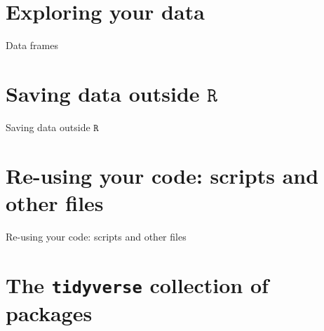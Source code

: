 \documentclass[
  11pt,
  ignorenonframetext,
]{beamer}
\newcommand{\R}{\texttt{R}}
\begin{document}
\begin{frame}{}
\protect\hypertarget{section}{}
\end{frame}

\hypertarget{exploring-your-data}{%
\section{Exploring your data}\label{exploring-your-data}}

\begin{frame}{Data frames}
\protect\hypertarget{data-frames}{}
\end{frame}

\hypertarget{saving-data-outside-r}{%
\section{\texorpdfstring{Saving data outside
\(\R\)}{Saving data outside \textbackslash R}}\label{saving-data-outside-r}}

\begin{frame}{Saving data outside \(\R\)}
\end{frame}

\hypertarget{re-using-your-code-scripts-and-other-files}{%
\section{Re-using your code: scripts and other
files}\label{re-using-your-code-scripts-and-other-files}}

\begin{frame}{Re-using your code: scripts and other files}
\end{frame}

\hypertarget{the-tidyverse-collection-of-packages}{%
\section{\texorpdfstring{The \texttt{tidyverse} collection of
packages}{The tidyverse collection of packages}}\label{the-tidyverse-collection-of-packages}}
\end{document}
